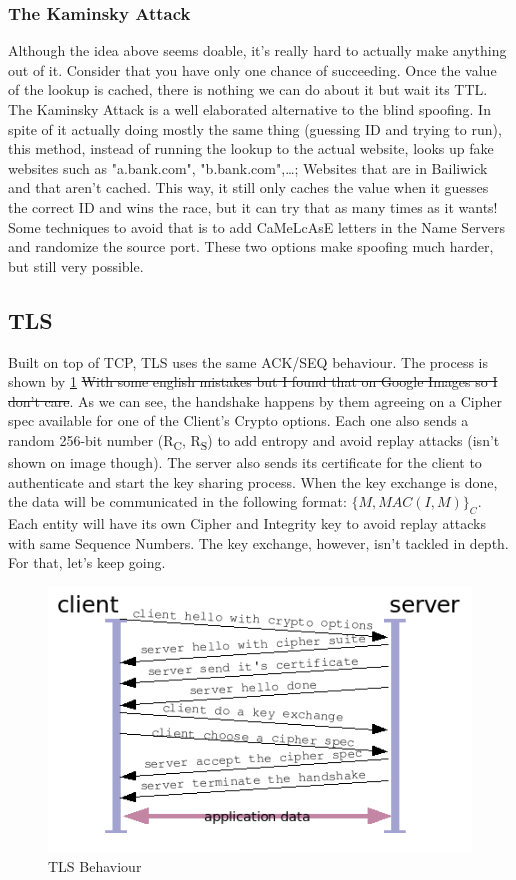 \documentclass[11pt]{article}
\begin{document}
{\subsubsection{The Kaminsky Attack}
\label{sec:org41108b0}
Although the idea above seems doable, it's really hard to actually make anything out of it. Consider that you have only one chance of succeeding. Once the value of the lookup is cached, there is nothing we can do about it but wait its TTL. The Kaminsky Attack is a well elaborated alternative to the blind spoofing. In spite of it actually doing mostly the same thing (guessing ID and trying to run), this method, instead of running the lookup to the actual website, looks up fake websites such as "a.bank.com", "b.bank.com",\ldots{}; Websites that are in Bailiwick and that aren't cached. This way, it still only caches the value when it guesses the correct ID and wins the race, but it can try that as many times as it wants! Some techniques to avoid that is to add CaMeLcAsE letters in the Name Servers and randomize the source port. These two options make spoofing much harder, but still very possible.

\subsection{TLS}
\label{sec:org381965f}
Built on top of TCP, TLS uses the same ACK/SEQ behaviour. The process is shown by \ref{TLS} \sout{With some english mistakes but I found that on Google Images so I don't care}. As we can see, the handshake happens by them agreeing on a Cipher spec available for one of the Client's Crypto options. Each one also sends a random 256-bit number (R\textsubscript{C}, R\textsubscript{S}) to add entropy and avoid replay attacks (isn't shown on image though). The server also sends its certificate for the client to authenticate and start the key sharing process. When the key exchange is done, the data will be communicated in the following format: \(\{M,MAC(I, M)\}_C\). Each entity will have its own Cipher and Integrity key to avoid replay attacks with same Sequence Numbers. The key exchange, however, isn't tackled in depth. For that, let's keep going.

\begin{figure}[htbp]
\centering
\includegraphics[height=0.5\textwidth]{res/TLS.png}
\caption{\label{TLS}
TLS Behaviour}
\end{figure}

}
\end{document}
